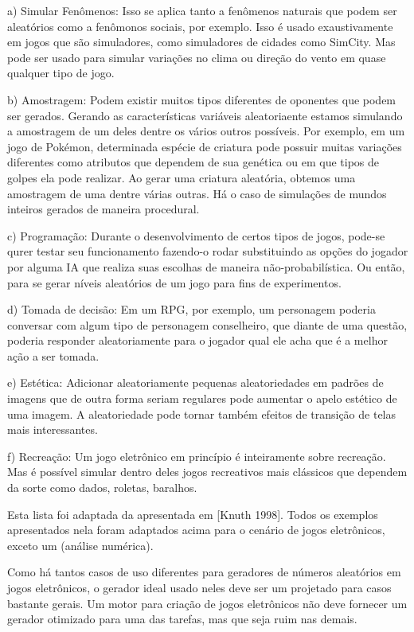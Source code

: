 a) Simular Fenômenos: Isso se aplica tanto a fenômenos naturais que
podem ser aleatórios como a fenômonos sociais, por exemplo. Isso é
usado exaustivamente em jogos que são simuladores, como simuladores de
cidades como SimCity. Mas pode ser usado para simular variações no
clima ou direção do vento em quase qualquer tipo de jogo.

b) Amostragem: Podem existir muitos tipos diferentes de oponentes que
podem ser gerados. Gerando as características variáveis aleatoriaente
estamos simulando a amostragem de um deles dentre os vários outros
possíveis. Por exemplo, em um jogo de Pokémon, determinada espécie de
criatura pode possuir muitas variações diferentes como atributos que
dependem de sua genética ou em que tipos de golpes ela pode
realizar. Ao gerar uma criatura aleatória, obtemos uma amostragem de
uma dentre várias outras. Há o caso de simulações de mundos inteiros
gerados de maneira procedural.

c) Programação: Durante o desenvolvimento de certos tipos de jogos,
pode-se qurer testar seu funcionamento fazendo-o rodar substituindo as
opções do jogador por alguma IA que realiza suas escolhas de maneira
não-probabilística. Ou então, para se gerar níveis aleatórios de um
jogo para fins de experimentos.

d) Tomada de decisão: Em um RPG, por exemplo, um personagem poderia
conversar com algum tipo de personagem conselheiro, que diante de uma
questão, poderia responder aleatoriamente para o jogador qual ele acha
que é a melhor ação a ser tomada.

e) Estética: Adicionar aleatoriamente pequenas aleatoriedades em
padrões de imagens que de outra forma seriam regulares pode aumentar o
apelo estético de uma imagem. A aleatoriedade pode tornar também
efeitos de transição de telas mais interessantes.

f) Recreação: Um jogo eletrônico em princípio é inteiramente sobre
recreação. Mas é possível simular dentro deles jogos recreativos mais
clássicos que dependem da sorte como dados, roletas, baralhos.

Esta lista foi adaptada da apresentada em [Knuth 1998]. Todos os
exemplos apresentados nela foram adaptados acima para o cenário de
jogos eletrônicos, exceto um (análise numérica).

Como há tantos casos de uso diferentes para geradores de números
aleatórios em jogos eletrônicos, o gerador ideal usado neles deve ser
um projetado para casos bastante gerais. Um motor para criação de
jogos eletrônicos não deve fornecer um gerador otimizado para uma das
tarefas, mas que seja ruim nas demais.

